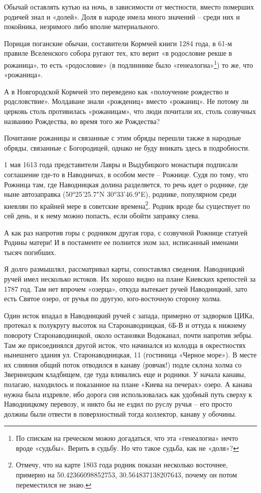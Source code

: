Обычай оставлять кутью на ночь, в зависимости от местности, вместо померших родичей знал и «долей». Доля в народе имела много значений – среди них и покойника, незримого либо вполне материального.

Порицая поганские обычаи, составители Кормчей книги 1284 года, в 61-м правиле Вселенского собора ругают тех, кто верит «в родословие рекше в рожаница», то есть «родословие» (в подлиннике было «генеалогиа»\footnote{По спискам на греческом можно догадаться, что эта «генеалогиа» нечто вроде «судьбы». Верить в судьбу. Но что такое судьба, как не «доля»?}) то же, что «рожаница».

А в Новгородской Кормчей это переведено как «полоучение рождество и родсловствие». Молдаване знали «рождениц» вместо «рожаниц». Не потому ли церковь столь противилась «рожаницам», что люди почитали их, столь созвучных названию Рождества, во время того же Рождества?

Почитание рожаницы и связанные с этим обряды перешли также в народные обряды, связанные с Богородицей, однако не буду вникать здесь в подробности.

1 мая 1613 года представители Лавры и Выдубицкого монастыря подписали соглашение где-то в Наводничах, в особом месте – Рожнице. Судя по тому, что Рожница там, где Наводницкая долина разделяется, то речь идет о роднике, где ныне автозаправка (50°25'25.7"N 30°33'46.9"E), роднике, популярном среди киевлян по крайней мере в советские времена\footnote{Отмечу, что на карте 1803 года родник показан несколько восточнее, примерно на 50.42366098852753, 30.564837138207643, почему он потом переместился не знаю.}. Родник вроде бы существует по сей день, и к нему можно попасть, если обойти заправку слева.

А как раз напротив горы с родником другая гора, с созвучной Рожнице статуей Родины матери! И в постаменте ее полнится эхом зал, исписанный именами тысяч погибших.

Я долго размышлял, рассматривал карты, сопоставлял сведения. Наводницкий ручей имел несколько истоков. Их хорошо видно на плане Киевских крепостей за 1787 год. Там нет впрочем «озерца», откуда вытекает ручей Наводницкий, зато есть Святое озеро, от ручья по другую, юго-восточную сторону холма.

Один исток впадал в Наводницкий ручей с запада, примерно от задворков ЦИКа, протекал к полукругу высоток на Старонаводницкая, 6Б-В и оттуда к нижнему повороту Старонаводницкой, около остановки Водоканал, почти напротив зебры. Там же присоединялся другой исток, что начинался из колодца в окрестностях нынешнего здания ул. Старонаводницкая, 11 (гостиница «Черное море»). В месте их слияния общий поток отводился в канаву (ровчак!) подле склона холма со Зверинецким кладбищем, где туда вливались еще и родники. У начала канавы, полагаю, находилось и показанное на плане «Киева на печерах» озеро. А канава нужна была издревле, ибо дорога сия использовалась как удобный путь сверху к Наводницкому перевозу, и никто бы не ездил по руслу ручья – его просто должны были отвести в поверхностный тогда коллектор, канаву у обочины.

